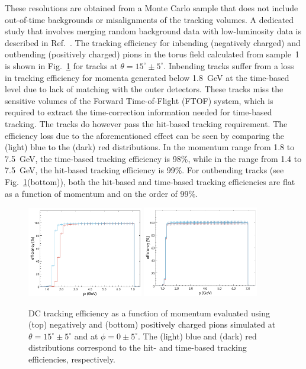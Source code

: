 These resolutions are obtained from a Monte Carlo sample that does not include out-of-time backgrounds or
misalignments of the tracking volumes. A dedicated study that involves merging random background data with
low-luminosity data is described in Ref.~\cite{clas12-nim}. The tracking efficiency for inbending (negatively
charged) and outbending (positively charged) pions in the torus field calculated from sample~1 is shown in
Fig.~\ref{fig:trkeff} for tracks at $\theta =15^\circ \pm 5^\circ$. Inbending tracks suffer from a loss in
tracking efficiency for momenta generated below 1.8~GeV at the time-based level due to lack of matching
with the outer detectors. These tracks miss the sensitive volumes of the Forward Time-of-Flight (FTOF)
system, which is required to extract the time-correction information needed for time-based tracking. The
tracks do however pass the hit-based tracking requirement. The efficiency loss due to the aforementioned
effect can be seen by comparing the (light) blue to the (dark) red distributions. In the momentum range from
1.8 to 7.5~GeV, the time-based tracking efficiency is 98\%, while in the range from 1.4 to 7.5~GeV, the
hit-based tracking efficiency is 99\%. For outbending tracks (see Fig.~\ref{fig:trkeff}(bottom)), both the
hit-based and time-based tracking efficiencies are flat as a function of momentum and on the order of 99\%. 

\begin{figure}[t]
\includegraphics[width=0.45\textwidth]{pics/DCTrkgEffNegTrks.png}
\includegraphics[width=0.45\textwidth]{pics/DCTrkgEffPosTrks.png}
\caption{DC tracking efficiency as a function of momentum evaluated using (top) negatively and (bottom) positively
  charged pions simulated at $\theta =15^\circ \pm 5^\circ$ and at $\phi = 0 \pm 5^\circ$. The (light) blue and (dark)
  red distributions correspond to the hit- and time-based tracking efficiencies, respectively.}
\label{fig:trkeff}
\end{figure}

